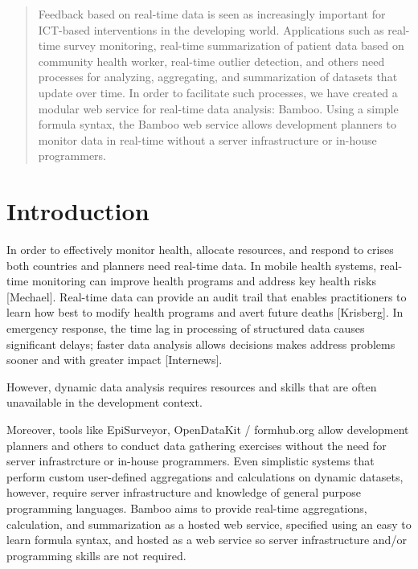\documentclass{acm_proc_article-sp}
\begin{document}
\maketitle
\begin{abstract}
Feedback based on real-time data is seen as increasingly important for ICT-based interventions in the developing world. Applications such as real-time survey monitoring, real-time summarization of patient data based on community health worker, real-time outlier detection, and others need processes for analyzing, aggregating, and summarization of datasets that update over time. In order to facilitate such processes, we have created a modular web service for real-time data analysis: Bamboo.  Using a simple formula syntax, the Bamboo web service allows development planners to monitor data in real-time without a server infrastructure or in-house programmers.
\end{abstract}




\section{Introduction}
In order to effectively monitor health, allocate resources, and respond to crises both countries and planners need real-time data.  In mobile health systems, real-time monitoring can improve health programs and address key health risks [Mechael].  Real-time data can provide an audit trail that enables practitioners to learn how best to modify health programs and avert future deaths [Krisberg].  In emergency response, the time lag in processing of structured data causes significant delays; faster data analysis allows decisions makes address problems sooner and with greater impact [Internews].

However, dynamic data analysis requires resources and skills that are often unavailable in the development context.

Moreover, tools like EpiSurveyor, OpenDataKit / formhub.org allow development planners and others to conduct data gathering exercises without the need for server infrastrcture or in-house programmers. Even simplistic systems that perform custom user-defined aggregations and calculations on dynamic datasets, however, require server infrastructure and knowledge of general purpose programming languages. Bamboo aims to provide real-time aggregations, calculation, and summarization as a hosted web service, specified using an easy to learn formula syntax, and hosted as a web service so server infrastructure and/or programming skills are not required.
\end{document}
